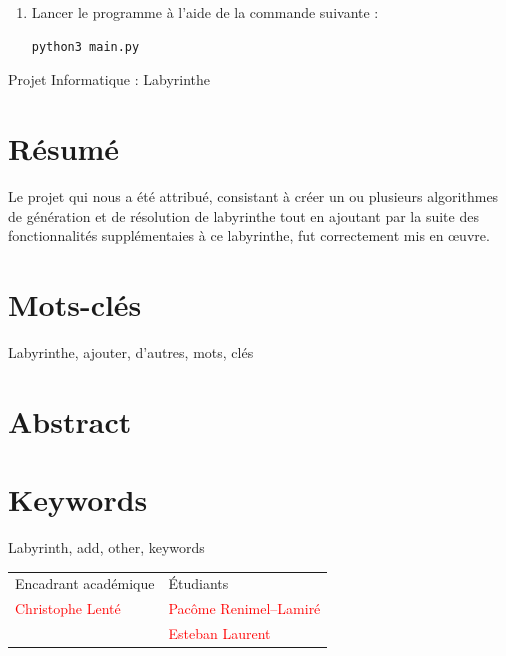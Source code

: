 \documentclass[12pt]{scrreprt} %
\begin{document}
\begin{enumerate}
    \item Lancer le programme à l'aide de la commande suivante :
          \begin{verbatim}
python3 main.py
    \end{verbatim}

\end{enumerate}



\newpage

\begin{center}
    \Huge
    Projet Informatique : Labyrinthe
\end{center}

\section*{Résumé}

Le projet qui nous a été attribué, consistant à créer un ou plusieurs algorithmes de génération et de résolution de labyrinthe tout en ajoutant par la suite des fonctionnalités supplémentaies à ce labyrinthe, fut correctement mis en œuvre.

\section*{Mots-clés}

Labyrinthe, ajouter, d'autres, mots, clés

\section*{Abstract}
\blindtext

\section*{Keywords}

Labyrinth, add, other, keywords

\hrulefill

\vfill


\begin{table}[h]
    \begin{tabularx}{\textwidth}{|X|Y|}
        \hline
        Encadrant académique              & Étudiants                               \\
        \textcolor{red}{Christophe Lenté} & \textcolor{red}{Pacôme Renimel--Lamiré} \\
                                          & \textcolor{red}{Esteban Laurent}        \\
        \hline
    \end{tabularx}
\end{table}
\end{document}
